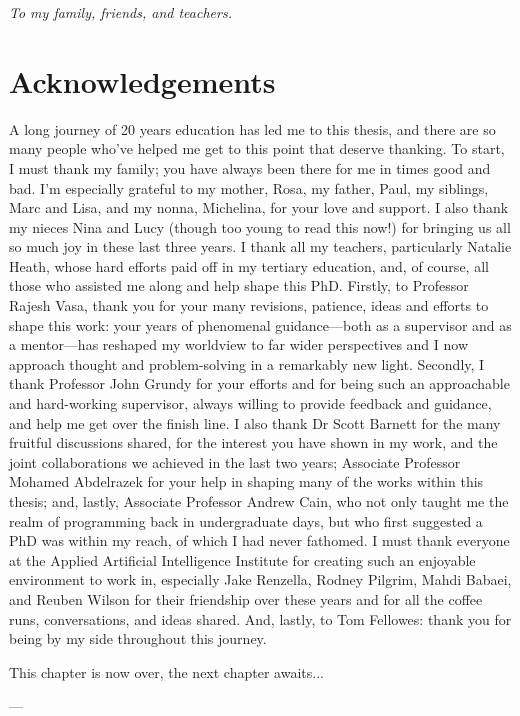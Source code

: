\cleardoublepage
\pagestyle{empty}
\begin{center}
  \vspace*{0.3\paperheight}
  \textit{To my family, friends, and teachers.}
\end{center}
\pagestyle{fancy}

\chapter*{Acknowledgements}

\vspace{-2\bigskipamount}

A long journey of 20 years education has led me to this thesis, and there are so many people who've helped me get to this point that deserve thanking. To start, I must thank my family; you have always been there for me in times good and bad. I'm especially grateful to my mother, Rosa, my father, Paul, my siblings, Marc and Lisa, and my nonna, Michelina, for your love and support. I also thank my nieces Nina and Lucy (though too young to read this now!) for bringing us all so much joy in these last three years. I thank all my teachers, particularly Natalie Heath, whose hard efforts paid off in my tertiary education, and, of course, all those who assisted me along and help shape this PhD. Firstly, to Professor Rajesh Vasa, thank you for your many revisions, patience, ideas and efforts to shape this work: your years of phenomenal guidance---both as a supervisor and as a mentor---has reshaped my worldview to far wider perspectives and I now approach thought and problem-solving in a remarkably new light. Secondly, I thank Professor John Grundy for your efforts and for being such an approachable and hard-working supervisor, always willing to provide feedback and guidance, and help me get over the finish line. I also thank Dr Scott Barnett for the many fruitful discussions shared, for the interest you have shown in my work, and the joint collaborations we achieved in the last two years; Associate Professor Mohamed Abdelrazek for your help in shaping many of the works within this thesis; and, lastly, Associate Professor Andrew Cain, who not only taught me the realm of programming back in undergraduate days, but who first suggested a PhD was within my reach, of which I had never fathomed. I must thank everyone at the Applied Artificial Intelligence Institute for creating such an enjoyable environment to work in, especially Jake Renzella, Rodney Pilgrim, Mahdi Babaei, and Reuben Wilson for their friendship over these years and for all the coffee runs, conversations, and ideas shared. And, lastly, to Tom Fellowes: thank you for being by my side throughout this journey. 

\bigskip
\noindent
This chapter is now over, the next chapter awaits...

\bigskip
\noindent
\hspace{\fill}
\parbox[b]{0.4\linewidth}{
\raggedleft
\small
--- \theauthor{}\\
\thedate{}
}